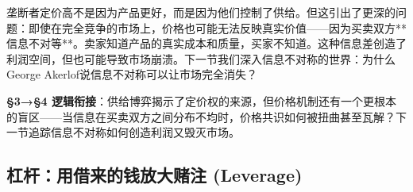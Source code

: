\documentclass[openany, a4paper, 12pt]{book}
\begin{document}
垄断者定价高不是因为产品更好，而是因为他们控制了供给。但这引出了更深的问题：即使在完全竞争的市场上，价格也可能无法反映真实价值——因为买卖双方**信息不对等**。卖家知道产品的真实成本和质量，买家不知道。这种信息差创造了利润空间，但也可能导致市场崩溃。下一节我们深入信息不对称的世界：为什么George Akerlof说信息不对称可以让市场完全消失？

	\textbf{§3→§4 逻辑衔接}：供给博弈揭示了定价权的来源，但价格机制还有一个更根本的盲区——当信息在买卖双方之间分布不均时，价格共识如何被扭曲甚至瓦解？下一节追踪信息不对称如何创造利润又毁灭市场。


	
	\subsection{杠杆：用借来的钱放大赌注 (Leverage)}
\end{document}
